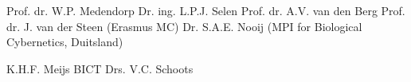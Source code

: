 
\clearpage

\noindent {}
\noindent \npar Prof. dr. W.P. Medendorp
\npar
\noindent {}
\noindent \npar Dr. ing. L.P.J. Selen
\npar
\vspace{0.5cm}
\noindent {}
\noindent \npar Prof. dr. A.V. van den Berg
\noindent \npar Prof. dr. J. van der Steen (Erasmus MC)
\noindent \npar Dr. S.A.E. Nooij (MPI for Biological Cybernetics, Duitsland)

\vfill

\noindent {}
\noindent \npar K.H.F. Meijs BICT
\noindent \npar Drs. V.C. Schoots
